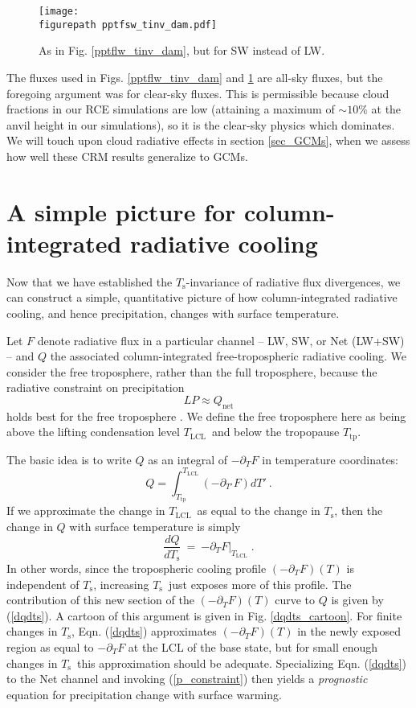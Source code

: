 \documentclass[10pt]{article}
\newcommand{\beqn}{\begin{equation}}
\newcommand{\eeqn}{\end{equation}}
\newcommand{\eqnref}[1]{(\ref{#1})}
\newcommand{\n}{\nonumber}
\newcommand{\der}[2]{\ensuremath{\frac{d #1}{d #2}}}
\newcommand{\ppt}{\ensuremath{\partial_T}}
\newcommand{\Qnet}{\ensuremath{Q_\mathrm{net}}}
\newcommand{\Ts}{\ensuremath{T_\mathrm{s}}}
\newcommand{\Tlcl}{\ensuremath{T_\mathrm{LCL}}}
\newcommand{\Ttp}{\ensuremath{T_\mathrm{tp}}}
\newcommand{\figurepath}{../figures/}
\begin{document}
\begin{figure}[t]
	\begin{center}
			\texttt{[image: \\figurepath pptfsw\_tinv\_dam.pdf]}
		\caption{As in Fig. \ref{pptflw_tinv_dam}, but for SW instead of LW.
		\label{pptfsw_tinv_dam}
		}
	\end{center}
\end{figure}


The fluxes used in Figs.  \ref{pptflw_tinv_dam} and \ref{pptfsw_tinv_dam} are all-sky fluxes, but the foregoing argument was for clear-sky fluxes. This is permissible because cloud fractions in our RCE simulations are low (attaining a maximum of $\sim 10 \%$ at the anvil height in our simulations), so it is the clear-sky physics which dominates. We will touch upon cloud radiative effects in section \ref{sec_GCMs}, when we assess how well these CRM results generalize to GCMs.
 
		
\section{A simple picture for column-integrated radiative cooling} \label{sec_simple_Q}

Now that we have established  the \Ts-invariance of radiative flux divergences, we can construct a simple, quantitative picture of how column-integrated radiative cooling, and hence precipitation,  changes with surface temperature. 
	
	Let $F$ denote radiative flux in a particular channel -- LW, SW, or Net (LW+SW) -- and $Q$ the associated column-integrated free-tropospheric radiative cooling. We consider  the free troposphere, rather than the full troposphere, because the radiative constraint on precipitation 
		\beqn
			LP \approx \Qnet
		\label{p_constraint}
		\eeqn
		 holds best for the free troposphere  \citep{ogorman2012}. We define the free troposphere here as being above the lifting condensation level \Tlcl\ and below the tropopause \Ttp.
	
	  The basic idea is to write $Q$ as an integral of $-\ppt F$  in temperature coordinates: 
	\beqn
		Q =  \int_{\Ttp}^{\Tlcl} (-\partial_{T'} F) dT' \ . 
		\n
	\eeqn
   If we approximate the change in  \Tlcl\ as equal to the change in \Ts, then the change in $Q$ with surface temperature is  simply
	\beqn
		\der{Q}{\Ts} \ =\  \left.  -\ppt F\right|_{\Tlcl}  \; .
	\label{dqdts}
	\eeqn
In other words, since the tropospheric cooling profile $(-\ppt F)(T)$  is independent of \Ts, increasing \Ts\ just exposes more of this profile.  The contribution of this new section of the $(-\ppt F)(T)$ curve to $Q$ is given by \eqnref{dqdts}.  A cartoon of this argument is given in Fig. \ref{dqdts_cartoon}. For finite changes in \Ts, Eqn. \eqnref{dqdts} approximates $(-\ppt F)(T)$ in the newly exposed region as equal to $-\ppt F$ at the LCL of the base state, but for small enough changes in \Ts\ this approximation should be adequate. Specializing Eqn. \eqnref{dqdts} to the Net channel and invoking \eqnref{p_constraint} then yields a \emph{prognostic} equation for precipitation change with surface warming.
\end{document}
